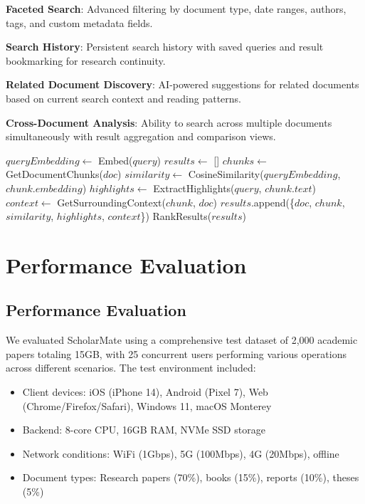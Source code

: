 \documentclass[conference]{IEEEtran}
\begin{document}
\textbf{Faceted Search}: Advanced filtering by document type, date ranges, authors, tags, and custom metadata fields.

\textbf{Search History}: Persistent search history with saved queries and result bookmarking for research continuity.

\textbf{Related Document Discovery}: AI-powered suggestions for related documents based on current search context and reading patterns.

\textbf{Cross-Document Analysis}: Ability to search across multiple documents simultaneously with result aggregation and comparison views.

\begin{algorithm}[htbp]
\caption{Semantic Search with Highlighting}
\begin{algorithmic}[1]
    \State $queryEmbedding \gets$ Embed($query$)
    \State $results \gets$ []
        \State $chunks \gets$ GetDocumentChunks($doc$)
            \State $similarity \gets$ CosineSimilarity($queryEmbedding$, $chunk.embedding$)
                \State $highlights \gets$ ExtractHighlights($query$, $chunk.text$)
                \State $context \gets$ GetSurroundingContext($chunk$, $doc$)
                \State $results$.append(\{$doc$, $chunk$, $similarity$, $highlights$, $context$\})
            \EndIf
        \EndFor
    \EndFor
    \State \Return RankResults($results$)
\EndProcedure
\end{algorithmic}
\end{algorithm}

\section{Performance Evaluation}

\subsection{Performance Evaluation}

We evaluated ScholarMate using a comprehensive test dataset of 2,000 academic papers totaling 15GB, with 25 concurrent users performing various operations across different scenarios. The test environment included:

\begin{itemize}
\item Client devices: iOS (iPhone 14), Android (Pixel 7), Web (Chrome/Firefox/Safari), Windows 11, macOS Monterey
\item Backend: 8-core CPU, 16GB RAM, NVMe SSD storage
\item Network conditions: WiFi (1Gbps), 5G (100Mbps), 4G (20Mbps), offline
\item Document types: Research papers (70\%), books (15\%), reports (10\%), theses (5\%)
\end{itemize}
\end{document}
